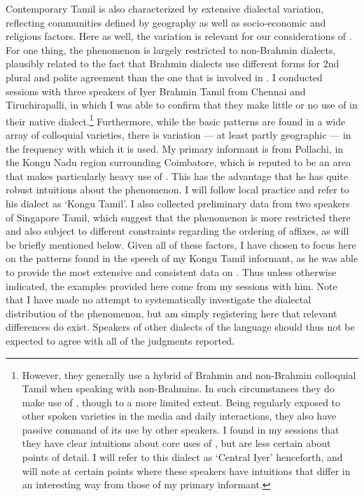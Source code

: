 \documentclass[output=paper, modfonts, nonflat]{langsci/langscibook}
\begin{document}
Contemporary Tamil is also characterized by extensive dialectal
variation, reflecting communities defined by geography as well as
socio-economic and religious factors. Here as well, the variation is
relevant for our considerations of \allagr. For one thing, the
phenomenon is largely restricted to non-Brahmin dialects, plausibly
related to the fact that Brahmin dialects use different forms for 2nd
plural and polite agreement than the one that is involved in
\allagr. I conducted sessions with three speakers of Iyer Brahmin
Tamil from Chennai and Tiruchirapalli, in which I was able to confirm
that they make little or no use of \allagr{} in their native
dialect.\footnote{However, they generally use a hybrid of Brahmin and
  non-Brahmin colloquial Tamil when speaking with non-Brahmins. In
  such circumstances they do make use of \allagr, though to a more
  limited extent. Being regularly exposed to other spoken varieties in
  the media and daily interactions, they also have passive command of
  its use by other speakers. I found in my sessions that they have
  clear intuitions about core uses of \allagr, but are less certain
  about points of detail. I will refer to this dialect as `Central
  Iyer' henceforth, and will note at certain points where these
  speakers have intuitions that differ in an interesting way from
  those of my primary informant.}  Furthermore, while the basic
\allagr{} patterns are found in a wide array of colloquial varieties,
there is variation --- at least partly geographic --- in the frequency
with which it is used. My primary informant is from Pollachi, in the
Kongu Nadu region surrounding Coimbatore, which is reputed to be an
area that makes particularly heavy use of \allagr. This has the
advantage that he has quite robust intuitions about the phenomenon. I
will follow local practice and refer to his dialect as `Kongu
Tamil'. I also collected preliminary data from two speakers of
Singapore Tamil, which suggest that the phenomenon is more restricted
there and also subject to different constraints regarding the ordering
of affixes, as will be briefly mentioned below.  Given all of these
factors, I have chosen to focus here on the patterns found in the
speech of my Kongu Tamil informant, as he was able to provide the most
extensive and consistent data on \allagr. Thus unless otherwise
indicated, the examples provided here come from my sessions with
him. Note that I have made no attempt to systematically investigate
the dialectal distribution of the phenomenon, but am simply
registering here that relevant differences do exist.  Speakers of
other dialects of the language should thus not be expected to agree
with all of the judgments reported.
\end{document}
